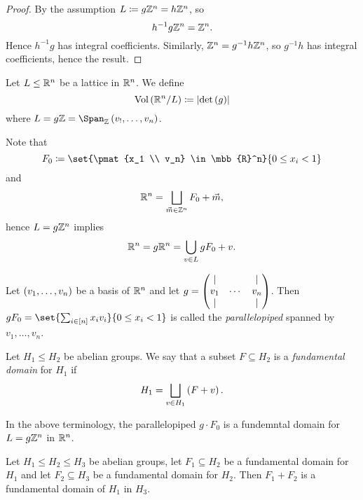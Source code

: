 \documentclass[11pt]{karticle}
\begin{document}
\begin{proof}
By the assumption $L \coloneqq g \mathbb{Z}^n = h \mathbb{Z}^n$, so
\[h^{-1} g \mathbb{Z}^n = \mathbb{Z}^n \text{.}\]
Hence $h^{-1} g$ has integral coefficients.
Similarly,
$\mathbb{Z}^n = g^{-1} h \mathbb{Z}^n$, so $g^{-1} h$ has integral coefficients, hence the result.
\end{proof}

\begin{definition}
Let $L \leq \mathbb{R}^n$ be a lattice in $\mathbb{R}^n$. We define
\[\mathrm{Vol}\left( \mathbb{R}^n / L \right) \coloneqq \left| \det\left( g \right) \right|\]
where $L = g \mbb{Z} = \Span_{\mbb{Z}}\prs{v_!, \ldots, v_n}$.
\end{definition}

\begin{remark}
Note that
\[F_0 \coloneqq \set{\pmat{x_1 \\ v_n} \in \mbb{R}^n}{0 \leq x_i < 1}\]
and
\[\mathbb{R}^n = \bigsqcup_{\vec{m} \in \mathbb{Z}^n} F_0 + \vec{m} \text{,}\]
hence $L = g \mathbb{Z}^n$
implies
\[\mathbb{R}^n = g\mathbb{R}^n = \bigcup_{v \in L} g F_0 + v \text{.}\]
\end{remark}

\begin{definition}
Let $\left( v_1, \ldots, v_n \right)$ be a basis of $\mathbb{R}^n$ and let $g = \begin{pmatrix}\vert & & \vert \\ v_1 & \cdots & v_n \\ \vert & & \vert\end{pmatrix}$.
Then $g F_0 = \set{\sum_{i \in \brs{n}} x_i v_i}{0 \leq x_i < 1}$ is called the \emph{parallelopiped} spanned by $v_1, \ldots, v_n$.
\end{definition}

\begin{definition}
Let $H_1 \leq H_2$ be abelian groups. We say that a subset $F \subseteq H_2$ is a \emph{fundamental domain} for $H_1$ if
\[H_1 = \bigsqcup_{v \in H_1} \left( F + v \right) \text{.}\]
\end{definition}

\begin{remark}
In the above terminology, the parallelopiped $g \cdot F_0$ is a fundemntal domain for $L = g \mathbb{Z}^n$ in $\mathbb{R}^n$.
\end{remark}

\begin{proposition}
Let $H_1 \leq H_2 \leq H_3$ be abelian groups, let $F_1 \subseteq  H_2$ be a fundamental domain for $H_1$ and let $F_2 \subseteq H_3$ be a fundamental domain for $H_2$. Then $F_1 + F_2$ is a fundamental domain of $H_1$ in $H_3$.
\end{proposition}
\end{document}
